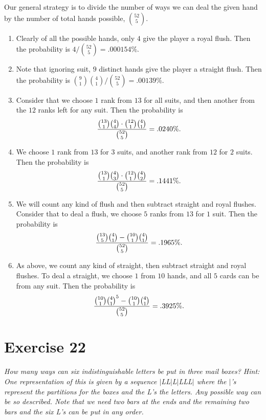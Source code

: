 \documentclass{abrice}
\begin{document}
\bigskip

Our general strategy is to divide the number of ways we can deal
the given hand by the number of total hands possible, ${52 \choose 5}$.

\begin{enumerate}[label=(\alph*)]
\item Clearly of all the possible hands, only $4$ give the player a
  royal flush. Then the probability is $4/{52 \choose 5} = .000154\%$.
\item Note that ignoring suit, $9$ distinct hands give the player a
  straight flush. Then the probability is
  ${9 \choose 1}{4 \choose 1}/{52 \choose 5} = .00139\%$.
\item Consider that we choose $1$ rank from $13$ for all suits, and
  then another from the $12$ ranks left for any suit. Then the
  probability is
  \[
  {{13 \choose 1} {4 \choose 4} \cdot {12 \choose 1} {4 \choose 1}
    \over {52 \choose 5}} = .0240\%.
  \]
\item We choose $1$ rank from $13$ for $3$ suits, and another rank
  from $12$ for $2$ suits. Then the probability is
  \[
  {{13 \choose 1} {4 \choose 3} \cdot {12 \choose 1} {4 \choose 2}
    \over {52 \choose 5}} = .1441\%.
  \]
\item We will count any kind of flush and then subtract straight and
  royal flushes. Consider that to deal a flush, we choose $5$ ranks
  from $13$ for $1$ suit. Then the probability is
  \[
  {{13 \choose 5} {4 \choose 1} - {10 \choose 1} {4 \choose 1} \over
    {52 \choose 5}} = .1965\%.
  \]
\item As above, we count any kind of straight, then subtract straight
  and royal flushes. To deal a straight, we choose $1$ from $10$
  hands, and all $5$ cards can be from any suit. Then the probability
  is
  \[
  { {10 \choose 1} {4 \choose 1}^5 - {10 \choose 1} {4 \choose 1}
    \over {52 \choose 5}} = .3925\%.
  \]
\end{enumerate}

\section{Exercise 22}

\emph{How many ways can six indistinguishable letters be put in three
  mail boxes?  \emph{Hint}: One representation of this is given by a
  sequence $|$LL$|$L$|$LLL$|$ where the $|$'s represent the partitions
  for the boxes and the L's the letters.  Any possible way can be so
  described.  Note that we need two bars at the ends and the remaining
  two bars and the six L's can be put in any order.}
\end{document}

